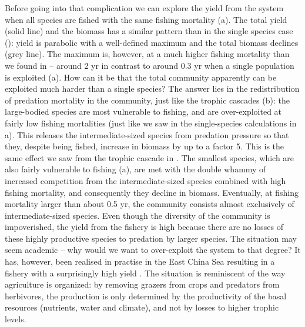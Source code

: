 Before going into that complication we can explore the yield from the system when all species are fished with the same fishing mortality (a).  The total yield (solid line) and the biomass has a similar pattern than in the single species case (): yield is parabolic with a well-defined maximum and the total biomass declines (grey line).  The maximum is, however, at a much higher fishing mortality than we found in  -- around 2 yr{\per} in contrast to around 0.3 yr{\per} when a single population is exploited (a).  How can it be that the total community apparently can be exploited much harder than a single species?  The answer lies in the redistribution of predation mortality in the community, just like the trophic cascades (b): the large-bodied species are most vulnerable to fishing, and are over-exploited at fairly low fishing mortalities (just like we saw in the single-species calculations in a).  This releases the intermediate-sized species from predation pressure so that they, despite being fished, increase in biomass by up to a factor 5. This is the same effect we saw from the trophic cascade in .  The smallest species, which are also fairly vulnerable to fishing (a), are met with the double whammy of increased competition from the intermediate-sized species combined with high fishing mortality, and consequently they decline in biomass.  Eventually, at fishing mortality larger than about 0.5 yr\per, the community consists almost exclusively of intermediate-sized species.  Even though the diversity of the community is impoverished, the yield from the fishery is high because there are no losses of these highly productive species to predation by larger species.  The situation may seem academic -- why would we want to over-exploit the system to that degree?  It has, however, been realised in practise in the East China Sea resulting in a fishery with a surprisingly high yield \citep{Szuwalski2017}. The situation is reminiscent of the way agriculture is organized: by removing grazers from crops and predators from herbivores, the production is only determined by the productivity of the basal resources (nutrients, water and climate), and not by losses to higher trophic levels.

